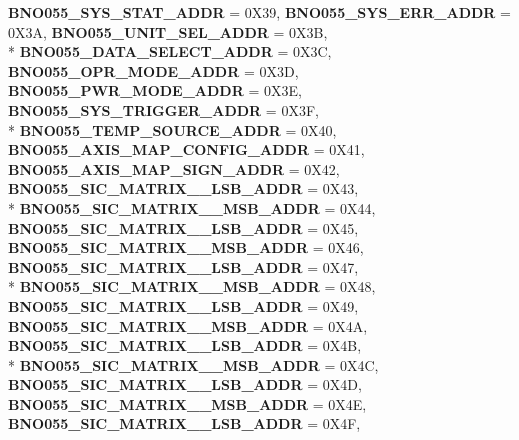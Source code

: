 \begin{DoxyCompactItemize}
{\bfseries B\-N\-O055\-\_\-\-S\-Y\-S\-\_\-\-S\-T\-A\-T\-\_\-\-A\-D\-D\-R} = 0\-X39, 
{\bfseries B\-N\-O055\-\_\-\-S\-Y\-S\-\_\-\-E\-R\-R\-\_\-\-A\-D\-D\-R} = 0\-X3\-A, 
{\bfseries B\-N\-O055\-\_\-\-U\-N\-I\-T\-\_\-\-S\-E\-L\-\_\-\-A\-D\-D\-R} = 0\-X3\-B, 
\\*
{\bfseries B\-N\-O055\-\_\-\-D\-A\-T\-A\-\_\-\-S\-E\-L\-E\-C\-T\-\_\-\-A\-D\-D\-R} = 0\-X3\-C, 
{\bfseries B\-N\-O055\-\_\-\-O\-P\-R\-\_\-\-M\-O\-D\-E\-\_\-\-A\-D\-D\-R} = 0\-X3\-D, 
{\bfseries B\-N\-O055\-\_\-\-P\-W\-R\-\_\-\-M\-O\-D\-E\-\_\-\-A\-D\-D\-R} = 0\-X3\-E, 
{\bfseries B\-N\-O055\-\_\-\-S\-Y\-S\-\_\-\-T\-R\-I\-G\-G\-E\-R\-\_\-\-A\-D\-D\-R} = 0\-X3\-F, 
\\*
{\bfseries B\-N\-O055\-\_\-\-T\-E\-M\-P\-\_\-\-S\-O\-U\-R\-C\-E\-\_\-\-A\-D\-D\-R} = 0\-X40, 
{\bfseries B\-N\-O055\-\_\-\-A\-X\-I\-S\-\_\-\-M\-A\-P\-\_\-\-C\-O\-N\-F\-I\-G\-\_\-\-A\-D\-D\-R} = 0\-X41, 
{\bfseries B\-N\-O055\-\_\-\-A\-X\-I\-S\-\_\-\-M\-A\-P\-\_\-\-S\-I\-G\-N\-\_\-\-A\-D\-D\-R} = 0\-X42, 
{\bfseries B\-N\-O055\-\_\-\-S\-I\-C\-\_\-\-M\-A\-T\-R\-I\-X\-\_\-\_\-\-L\-S\-B\-\_\-\-A\-D\-D\-R} = 0\-X43, 
\\*
{\bfseries B\-N\-O055\-\_\-\-S\-I\-C\-\_\-\-M\-A\-T\-R\-I\-X\-\_\-\_\-\-M\-S\-B\-\_\-\-A\-D\-D\-R} = 0\-X44, 
{\bfseries B\-N\-O055\-\_\-\-S\-I\-C\-\_\-\-M\-A\-T\-R\-I\-X\-\_\-\_\-\-L\-S\-B\-\_\-\-A\-D\-D\-R} = 0\-X45, 
{\bfseries B\-N\-O055\-\_\-\-S\-I\-C\-\_\-\-M\-A\-T\-R\-I\-X\-\_\-\_\-\-M\-S\-B\-\_\-\-A\-D\-D\-R} = 0\-X46, 
{\bfseries B\-N\-O055\-\_\-\-S\-I\-C\-\_\-\-M\-A\-T\-R\-I\-X\-\_\-\_\-\-L\-S\-B\-\_\-\-A\-D\-D\-R} = 0\-X47, 
\\*
{\bfseries B\-N\-O055\-\_\-\-S\-I\-C\-\_\-\-M\-A\-T\-R\-I\-X\-\_\-\_\-\-M\-S\-B\-\_\-\-A\-D\-D\-R} = 0\-X48, 
{\bfseries B\-N\-O055\-\_\-\-S\-I\-C\-\_\-\-M\-A\-T\-R\-I\-X\-\_\-\_\-\-L\-S\-B\-\_\-\-A\-D\-D\-R} = 0\-X49, 
{\bfseries B\-N\-O055\-\_\-\-S\-I\-C\-\_\-\-M\-A\-T\-R\-I\-X\-\_\-\_\-\-M\-S\-B\-\_\-\-A\-D\-D\-R} = 0\-X4\-A, 
{\bfseries B\-N\-O055\-\_\-\-S\-I\-C\-\_\-\-M\-A\-T\-R\-I\-X\-\_\-\_\-\-L\-S\-B\-\_\-\-A\-D\-D\-R} = 0\-X4\-B, 
\\*
{\bfseries B\-N\-O055\-\_\-\-S\-I\-C\-\_\-\-M\-A\-T\-R\-I\-X\-\_\-\_\-\-M\-S\-B\-\_\-\-A\-D\-D\-R} = 0\-X4\-C, 
{\bfseries B\-N\-O055\-\_\-\-S\-I\-C\-\_\-\-M\-A\-T\-R\-I\-X\-\_\-\_\-\-L\-S\-B\-\_\-\-A\-D\-D\-R} = 0\-X4\-D, 
{\bfseries B\-N\-O055\-\_\-\-S\-I\-C\-\_\-\-M\-A\-T\-R\-I\-X\-\_\-\_\-\-M\-S\-B\-\_\-\-A\-D\-D\-R} = 0\-X4\-E, 
{\bfseries B\-N\-O055\-\_\-\-S\-I\-C\-\_\-\-M\-A\-T\-R\-I\-X\-\_\-\_\-\-L\-S\-B\-\_\-\-A\-D\-D\-R} = 0\-X4\-F, 

\end{DoxyCompactItemize}
